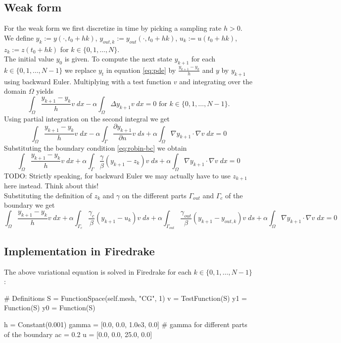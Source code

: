 \documentclass[
12pt, %
a4paper, %
onecolumn, %
portrait %
]{article}
\begin{document}
\subsection{Weak form}
For the weak form we first discretize in time by picking a sampling rate $h > 0$. We define $y_k := y(\cdot, t_0 + h k)$, $y_{out,k} := y_{out}(\cdot, t_0 + h k) $, $u_k := u(t_0 + h k)$, $z_k := z(t_0 + h k)$ for $k \in \{0, 1, \hdots, N\}$. \\
The initial value $y_0$ is given. To compute the next state $y_{k+1}$ for each $k \in \{0, 1, \hdots, N-1\}$  we replace $y_t$ in equation \eqref{eq:pde} by $\frac{y_{k+1} - y_k}{h}$ and $y$ by $y_{k+1}$ using backward Euler. Multiplying with a test function $v$ and integrating over the domain $\Omega$ yields
\begin{equation}
\int_{\Omega} \frac{y_{k+1} - y_k}{h} v \; dx - \alpha \int_{\Omega} \Delta y_{k+1} v \; dx = 0 \text{ for } k \in \{0, 1, \hdots, N-1\}.
\end{equation}
Using partial integration on the second integral we get
\begin{equation}
\int_{\Omega} \frac{y_{k+1} - y_k}{h} v \; dx - \alpha \int_{\Gamma}  \frac{\partial y_{k+1}}{\partial n} v \; ds + \alpha \int_{\Omega} \nabla y_{k+1} \cdot \nabla v \; dx = 0
\end{equation}
Substituting the boundary condition \eqref{eq:robin-bc} we obtain
\begin{equation}
\int_{\Omega} \frac{y_{k+1} - y_k}{h} v \; dx + \alpha \int_{\Gamma} \frac{ \gamma}{\beta}  (y_{k+1} - z_k) v \; ds + \alpha \int_{\Omega} \nabla y_{k+1} \cdot \nabla v \; dx = 0
\end{equation}
TODO: Strictly speaking, for backward Euler we may actually have to use $z_{k+1}$ here instead. Think about this!\\
Substituting the definition of $z_k$ and $\gamma$ on the different parts $\Gamma_{out}$ and $\Gamma_c$ of the boundary we get
\begin{equation}
\int_{\Omega} \frac{y_{k+1} - y_k}{h} v \; dx +  \alpha \int_{\Gamma_c} \frac{\gamma_c}{\beta}  (y_{k+1} - u_k) v \; ds  +  \alpha\int_{\Gamma_{out}} \frac{ \gamma_{out}}{\beta}  (y_{k+1} - y_{out,k}) v \; ds + \alpha \int_{\Omega} \nabla y_{k+1} \cdot \nabla v \; dx = 0
\end{equation}

\subsection{Implementation in Firedrake}
The above variational equation is solved in Firedrake for each $k \in \{0, 1, \hdots, N-1\}$:
\begin{python}
# Definitions 
S = FunctionSpace(self.mesh, "CG", 1)
v = TestFunction(S)
y1 = Function(S)
y0 = Function(S)

h = Constant(0.001)
gamma = [0.0, 0.0, 1.0e3, 0.0] # gamma for different parts of the boundary
ac = 0.2
u = [0.0, 0.0, 25.0, 0.0]
\end{python}
\end{document}
